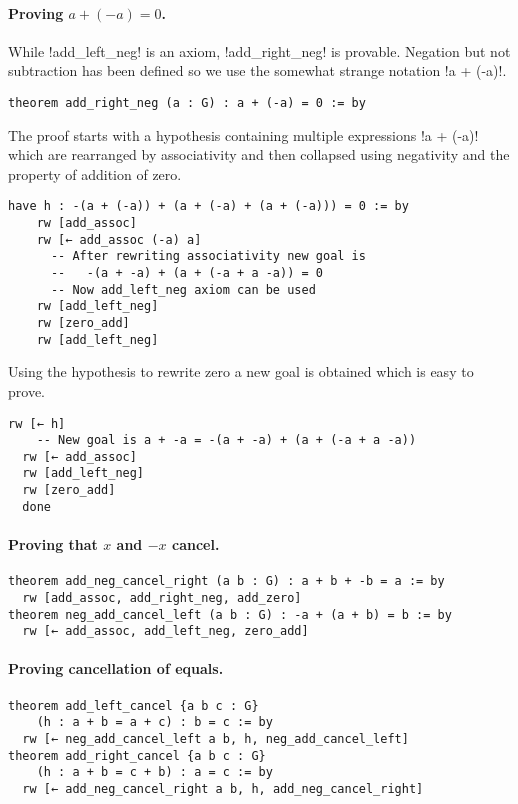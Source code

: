 \paragraph{Proving $a + (-a) = 0$.}
While !add_left_neg! is an axiom, !add_right_neg! is provable. Negation but not subtraction has been defined so we use the somewhat strange notation !a + (-a)!.
\begin{Verbatim}[firstnumber=last]
theorem add_right_neg (a : G) : a + (-a) = 0 := by
\end{Verbatim}
The proof starts with a hypothesis containing multiple expressions !a + (-a)! which are rearranged by associativity and then collapsed using negativity and the property of addition of zero.
\begin{Verbatim}[firstnumber=last]
  have h : -(a + (-a)) + (a + (-a) + (a + (-a))) = 0 := by
    rw [add_assoc]
    rw [← add_assoc (-a) a]
      -- After rewriting associativity new goal is
      --   -(a + -a) + (a + (-a + a -a)) = 0
      -- Now add_left_neg axiom can be used
    rw [add_left_neg]
    rw [zero_add]
    rw [add_left_neg]
\end{Verbatim}
Using the hypothesis to rewrite zero a new goal is obtained which is easy to prove.
\begin{Verbatim}[firstnumber=last]
  rw [← h]
    -- New goal is a + -a = -(a + -a) + (a + (-a + a -a))
  rw [← add_assoc]
  rw [add_left_neg]
  rw [zero_add]
  done
\end{Verbatim}
\paragraph{Proving that $x$ and $-x$ cancel.}
\begin{Verbatim}[firstnumber=last]
theorem add_neg_cancel_right (a b : G) : a + b + -b = a := by
  rw [add_assoc, add_right_neg, add_zero]
theorem neg_add_cancel_left (a b : G) : -a + (a + b) = b := by
  rw [← add_assoc, add_left_neg, zero_add]
\end{Verbatim}

\paragraph{Proving cancellation of equals.}
\begin{Verbatim}[firstnumber=last]
theorem add_left_cancel {a b c : G} 
    (h : a + b = a + c) : b = c := by
  rw [← neg_add_cancel_left a b, h, neg_add_cancel_left]
theorem add_right_cancel {a b c : G}
    (h : a + b = c + b) : a = c := by
  rw [← add_neg_cancel_right a b, h, add_neg_cancel_right]
\end{Verbatim}

